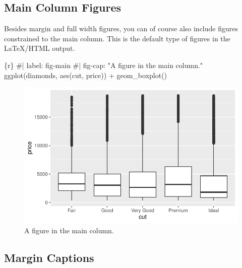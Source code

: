 \documentclass[
  letterpaper,
  DIV=11,
  numbers=noendperiod,
  oneside]{scrartcl}
\newenvironment{Shaded}{\begin{snugshade}}{\end{snugshade}}
\newcommand{\CommentTok}[1]{\textcolor[rgb]{0.37,0.37,0.37}{#1}}
\newcommand{\FunctionTok}[1]{\textcolor[rgb]{0.28,0.35,0.67}{#1}}
\newcommand{\InformationTok}[1]{\textcolor[rgb]{0.37,0.37,0.37}{#1}}
\newcommand{\NormalTok}[1]{\textcolor[rgb]{0.00,0.23,0.31}{#1}}
\newcommand{\SpecialCharTok}[1]{\textcolor[rgb]{0.37,0.37,0.37}{#1}}
\begin{document}
\hypertarget{main-column-figures}{%
\subsection{Main Column Figures}\label{main-column-figures}}

Besides margin and full width figures, you can of course also include
figures constrained to the main column. This is the default type of
figures in the LaTeX/HTML output.

\begin{Shaded}
\begin{Highlighting}[]
\InformationTok{\textasciigrave{}\textasciigrave{}\textasciigrave{}\{r\}}
\CommentTok{\#| label: fig{-}main}
\CommentTok{\#| fig{-}cap: "A figure in the main column."}
\FunctionTok{ggplot}\NormalTok{(diamonds, }\FunctionTok{aes}\NormalTok{(cut, price)) }\SpecialCharTok{+} \FunctionTok{geom\_boxplot}\NormalTok{()}
\InformationTok{\textasciigrave{}\textasciigrave{}\textasciigrave{}}
\end{Highlighting}
\end{Shaded}

\begin{figure}[H]

{\centering \includegraphics{HousePrices_files/figure-pdf/fig-main-1.pdf}

}

\caption{\label{fig-main}A figure in the main column.}

\end{figure}

\hypertarget{margin-captions}{%
\subsection{Margin Captions}\label{margin-captions}}
\end{document}
